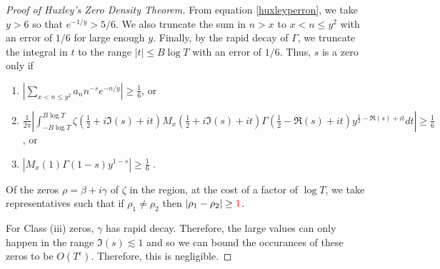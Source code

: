\begin{proof}[Proof of Huxley's Zero Density Theorem]
    From equation \ref{huxleyperron}, we take $y>6$ so that $e^{-1/y}>5/6$. We also truncate the sum in $n>x$ to $x<n\leq y^2$ with an error of $1/6$ for large enough $y$. Finally, by the rapid decay of $\Gamma$, we truncate the integral in $t$ to the range $|t|\leq B\log T$ with an error of $1/6$. Thus, $s$ is a zero only if \begin{enumerate}[label=(\roman{*})]
        \item $|\sum_{x<n\leq y^2}a_n n^{-s} e^{-n/y}|\geq \frac{1}{6}$, or
        \item $\frac{1}{2\pi}|\int_{-B\log T}^{B\log T}\zeta(\frac{1}{2}+i\Im(s)+it)M_x(\frac{1}{2}+i\Im(s)+it) \Gamma\left(\frac{1}{2}-\Re(s)+it\right) y^{\frac{1}{2}-\Re(s)+it} dt|\geq \frac{1}{6}$, or
        \item $|M_x(1)\Gamma(1-s)y^{1-s}|\geq \frac{1}{6}$ .
    \end{enumerate}
    Of the zeros $\rho = \beta+i\gamma$ of $\zeta$ in the region, at the cost of a factor of $\log T$, we take representatives such that if $\rho_1\neq \rho_2$ then $|\rho_1-\rho_2|\geq \textcolor{red}{1}$. 

    For Class (iii) zeros, $\gamma$ has rapid decay. Therefore, the large values can only happen in the range $\Im (s)\lesssim 1$ and so we can bound the occurances of these zeros to be $O(T^\epsilon)$. Therefore, this is negligible.


\end{proof}
